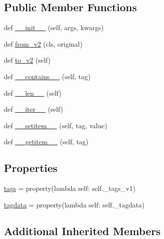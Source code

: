 \subsection*{Public Member Functions}
\begin{DoxyCompactItemize}
\item 
def \hyperlink{classPIL_1_1TiffImagePlugin_1_1ImageFileDirectory__v1_a9be3897477790918096954417321566d}{\+\_\+\+\_\+init\+\_\+\+\_\+} (self, args, kwargs)
\item 
def \hyperlink{classPIL_1_1TiffImagePlugin_1_1ImageFileDirectory__v1_af822a11825740351d5eeae942dca726f}{from\+\_\+v2} (cls, original)
\item 
def \hyperlink{classPIL_1_1TiffImagePlugin_1_1ImageFileDirectory__v1_a767487c5f2e7514f25df82485688db61}{to\+\_\+v2} (self)
\item 
def \hyperlink{classPIL_1_1TiffImagePlugin_1_1ImageFileDirectory__v1_a746bf5f4faa1b992dbb857b18438426e}{\+\_\+\+\_\+contains\+\_\+\+\_\+} (self, tag)
\item 
def \hyperlink{classPIL_1_1TiffImagePlugin_1_1ImageFileDirectory__v1_aae2b6964abd87699db6b5620cb170513}{\+\_\+\+\_\+len\+\_\+\+\_\+} (self)
\item 
def \hyperlink{classPIL_1_1TiffImagePlugin_1_1ImageFileDirectory__v1_a2e1e92f2dc84ed57171aabbfd2b7ba5e}{\+\_\+\+\_\+iter\+\_\+\+\_\+} (self)
\item 
def \hyperlink{classPIL_1_1TiffImagePlugin_1_1ImageFileDirectory__v1_a160b5d97e3aede405016e0f1b3ab3a52}{\+\_\+\+\_\+setitem\+\_\+\+\_\+} (self, tag, value)
\item 
def \hyperlink{classPIL_1_1TiffImagePlugin_1_1ImageFileDirectory__v1_a289cfd3b894de01487b39bbbca403c77}{\+\_\+\+\_\+getitem\+\_\+\+\_\+} (self, tag)
\end{DoxyCompactItemize}
\subsection*{Properties}
\begin{DoxyCompactItemize}
\item 
\hyperlink{classPIL_1_1TiffImagePlugin_1_1ImageFileDirectory__v1_a9283b5823c9436a5751ed37a73368f28}{tags} = property(lambda self\+: self.\+\_\+tags\+\_\+v1)
\item 
\hyperlink{classPIL_1_1TiffImagePlugin_1_1ImageFileDirectory__v1_a5384f5bda2e66169c9cb30667cdad42a}{tagdata} = property(lambda self\+: self.\+\_\+tagdata)
\end{DoxyCompactItemize}
\subsection*{Additional Inherited Members}


